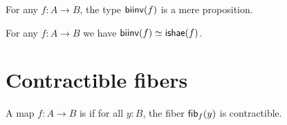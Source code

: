 \documentclass[hott-all.tex]{subfiles}
\begin{document}
\begin{thm}\label{thm:isprop-biinv}
  For any $f:A\to B$, the type $\mathsf{biinv}(f)$ is a mere proposition.
\end{thm}
%

\begin{cor}\label{thm:equiv-biinv-isequiv}
  For any $f:A\to B$ we have $\mathsf{biinv}(f) \simeq \mathsf{ishae}(f)$.
\end{cor}
%
%
\section{Contractible fibers}
\label{sec:contrf}

%

\begin{defn} \label{defn:equivalence}
  A map $f:A\to B$ is 
  if for all $y:B$, the fiber ${\mathsf{fib}}_{f}(y)$ is contractible.
\end{defn}
\end{document}
